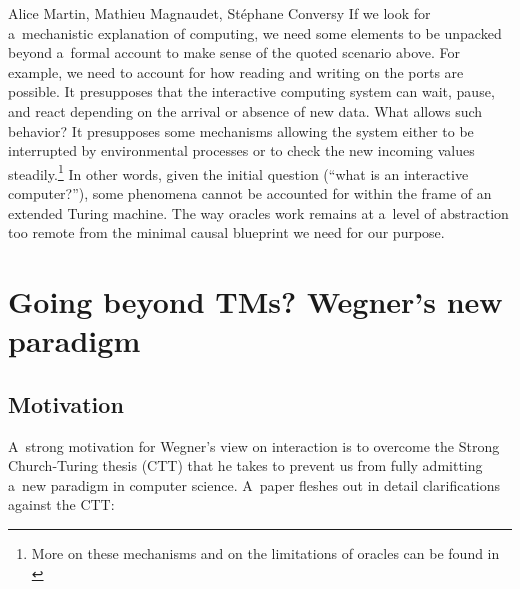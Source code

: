 \begin{artengenv2auth}{Alice Martin, Mathieu Magnaudet, Stéphane Conversy}
If we look for a~mechanistic explanation of computing, we need some elements to be unpacked beyond a~formal account to make sense of the quoted scenario above. For example, we need to account for how reading and writing on the ports are possible. It presupposes that the interactive computing system can wait, pause, and react depending on the arrival or absence of new data. What allows such behavior? It presupposes some mechanisms allowing the system either to be interrupted by environmental processes or to check the new incoming values steadily.\footnote{More on these mechanisms and on the limitations of oracles can be found in \parencite{Martin2023}} 
In other words, given the initial question (``what is an interactive computer?''), some phenomena cannot be accounted for within the frame of an extended Turing machine. The way oracles work remains at a~level of abstraction too remote from the minimal causal blueprint we need for our purpose.

\section{Going beyond TMs? Wegner’s new paradigm}
\label{Wegner}
\subsection{Motivation}

A~strong motivation for Wegner’s view on interaction is to overcome the Strong Church-Turing thesis (CTT) that he takes to prevent us from fully admitting a~new paradigm in computer science. A~paper fleshes out in detail clarifications against the CTT: 



\end{artengenv2auth}
